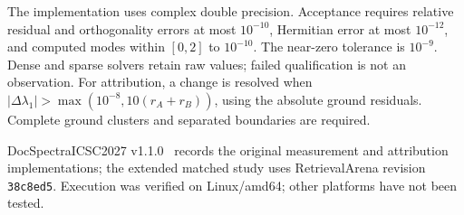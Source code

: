 The implementation uses complex double precision. Acceptance requires relative
residual and orthogonality errors at most $10^{-10}$, Hermitian error at most
$10^{-12}$, and computed modes within $[0,2]$ to $10^{-10}$. The near-zero
tolerance is $10^{-9}$. Dense and sparse solvers retain raw values; failed
qualification is not an observation. For attribution, a change is resolved when
$|\Delta\lambda_1|>\max(10^{-8},10(r_A+r_B))$, using the absolute ground residuals.
Complete ground clusters and separated boundaries are required.

DocSpectraICSC2027 v1.1.0~\cite{docspectraicsc2027} records the original measurement
and attribution implementations; the extended matched study uses RetrievalArena
revision \texttt{38c8ed5}.
Execution was verified on Linux/amd64; other platforms have not been tested.
